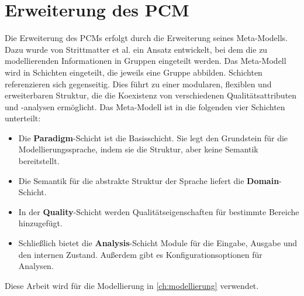 \section{Erweiterung des PCM}
Die Erweiterung des PCMs erfolgt durch die Erweiterung seines Meta-Modells. Dazu wurde von Strittmatter et al. \cite{Strittmatter} ein Ansatz entwickelt, bei dem die zu modellierenden Informationen in Gruppen eingeteilt werden. Das Meta-Modell wird in Schichten eingeteilt, die jeweils eine Gruppe abbilden. Schichten referenzieren sich gegenseitig. Dies führt zu einer modularen, flexiblen und erweiterbaren Struktur, die die Koexistenz von verschiedenen Qualitätsattributen und -analysen ermöglicht. Das Meta-Modell ist in die folgenden vier Schichten unterteilt:
\begin{itemize}
\item Die \textbf{Paradigm}-Schicht ist die Basisschicht. Sie legt den Grundstein für die Modellierungssprache, indem sie die Struktur, aber keine Semantik bereitstellt.
\item Die Semantik für die abstrakte Struktur der Sprache liefert die \textbf{Domain}-Schicht.
\item In der \textbf{Quality}-Schicht werden Qualitätseigenschaften für bestimmte Bereiche hinzugefügt.
\item Schließlich bietet die \textbf{Analysis}-Schicht Module für die Eingabe, Ausgabe und den internen Zustand. Außerdem gibt es Konfigurationsoptionen für Analysen.
\end{itemize}
Diese Arbeit wird für die Modellierung in \autoref{ch:modellierung} verwendet.
